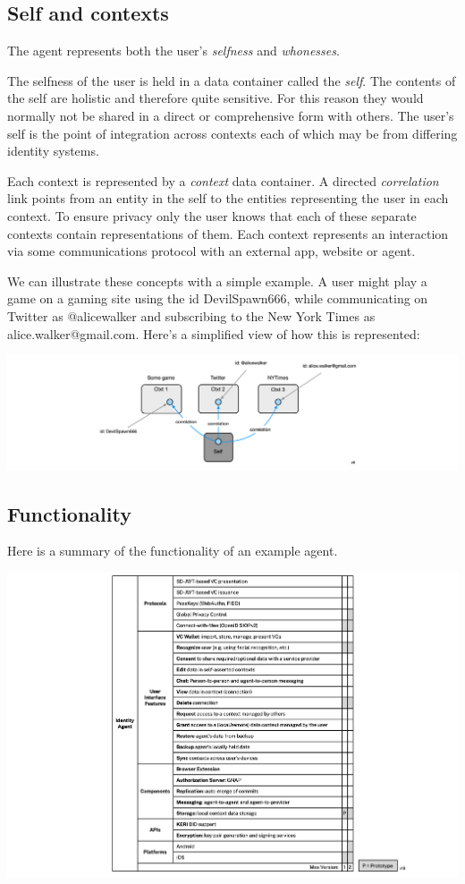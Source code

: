 \documentclass[11pt, oneside]{article}   	%
\begin{document}
\subsection{Self and contexts}
The agent represents both the user's \emph{selfness} and \emph{whonesses}.

The selfness of the user is held in a data container called the \emph{self}. The contents of the self are holistic and therefore quite sensitive. For this reason they would normally not be shared in a direct or comprehensive form with others. The user's self is the point of integration across contexts each of which may be from differing identity systems. 

Each context is represented by a \emph{context} data container. A directed \emph{correlation} link points from an entity in the self to the entities representing the user in each context. To ensure privacy only the user knows that each of these separate contexts contain representations of them. Each context represents an interaction via some communications protocol with an external app, website or agent. 

We can illustrate these concepts with a simple example. A user might play a game on a gaming site using the id DevilSpawn666, while communicating on Twitter as @alicewalker and subscribing to the New York Times as alice.walker@gmail.com. Here's a simplified view of how this is represented:

\includegraphics[width=\textwidth]{./images/example1.png}

\subsection{Functionality}

Here is a summary of the functionality of an example agent.

\includegraphics[width=\textwidth]{./images/agent-functionality.png}
\end{document}
